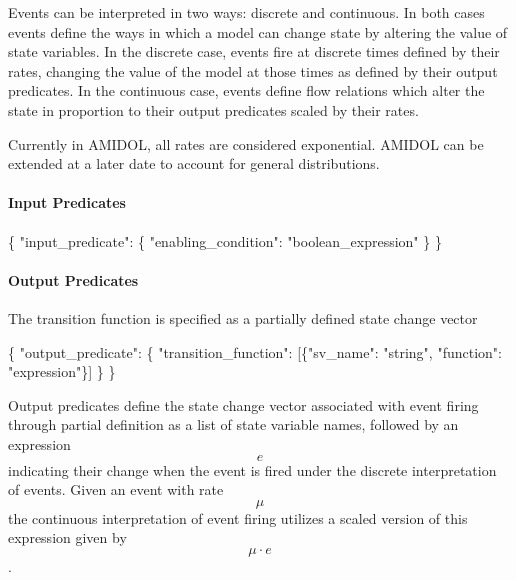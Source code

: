 \documentclass[]{article}
\newenvironment{Shaded}{}{}
\newcommand{\DataTypeTok}[1]{\textcolor[rgb]{0.56,0.13,0.00}{#1}}
\newcommand{\StringTok}[1]{\textcolor[rgb]{0.25,0.44,0.63}{#1}}
\newcommand{\OtherTok}[1]{\textcolor[rgb]{0.00,0.44,0.13}{#1}}
\newcommand{\FunctionTok}[1]{\textcolor[rgb]{0.02,0.16,0.49}{#1}}
\let\oldparagraph\paragraph
\renewcommand{\paragraph}[1]{\oldparagraph{#1}\mbox{}}
\begin{document}
Events can be interpreted in two ways: discrete and continuous. In both
cases events define the ways in which a model can change state by
altering the value of state variables. In the discrete case, events fire
at discrete times defined by their rates, changing the value of the
model at those times as defined by their output predicates. In the
continuous case, events define flow relations which alter the state in
proportion to their output predicates scaled by their rates.

Currently in AMIDOL, all rates are considered exponential. AMIDOL can be
extended at a later date to account for general distributions.

\paragraph{Input Predicates}\label{input-predicates}

\begin{Shaded}
\begin{Highlighting}[]
\FunctionTok{\{} \DataTypeTok{"input_predicate"}\FunctionTok{:} \FunctionTok{\{}
    \DataTypeTok{"enabling_condition"}\FunctionTok{:} \StringTok{"boolean_expression"}
  \FunctionTok{\}}
\FunctionTok{\}}
\end{Highlighting}
\end{Shaded}

\paragraph{Output Predicates}\label{output-predicates}

The transition function is specified as a partially defined state change
vector

\begin{Shaded}
\begin{Highlighting}[]
\FunctionTok{\{} \DataTypeTok{"output_predicate"}\FunctionTok{:} \FunctionTok{\{}
    \DataTypeTok{"transition_function"}\FunctionTok{:} \OtherTok{[}\FunctionTok{\{}\DataTypeTok{"sv_name"}\FunctionTok{:} \StringTok{"string"}\FunctionTok{,} \DataTypeTok{"function"}\FunctionTok{:} \StringTok{"expression"}\FunctionTok{\}}\OtherTok{]}
  \FunctionTok{\}}
\FunctionTok{\}}
\end{Highlighting}
\end{Shaded}

Output predicates define the state change vector associated with event
firing through partial definition as a list of state variable names,
followed by an expression \[e\] indicating their change when the event
is fired under the discrete interpretation of events. Given an event
with rate \[\mu\] the continuous interpretation of event firing utilizes
a scaled version of this expression given by \[\mu \cdot e\].
\end{document}
